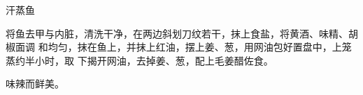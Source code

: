 \begin{recipe}{汗蒸鱼}

\ingredients


\preparation

将鱼去甲与内脏，清洗干净，在两边斜划刀纹若干，抹上食盐，将黄酒、味精、胡椒面调
和均匀，抹在鱼上，并抹上红油，摆上姜、葱，用网油包好置盘中，上笼蒸约半小时，取
下揭开网油，去掉姜、葱，配上毛姜醋佐食。

\features

味辣而鲜美。

\end{recipe}

